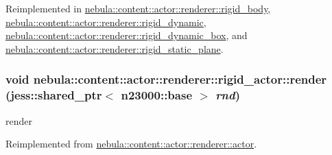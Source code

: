 Reimplemented in \hyperlink{classnebula_1_1content_1_1actor_1_1renderer_1_1rigid__body_a448e47741d24ba24fbedbd7438159a12}{nebula::content::actor::renderer::rigid\_\-body}, \hyperlink{classnebula_1_1content_1_1actor_1_1renderer_1_1rigid__dynamic_ae90eb12e9f68833bd1bf0b8360332f49}{nebula::content::actor::renderer::rigid\_\-dynamic}, \hyperlink{classnebula_1_1content_1_1actor_1_1renderer_1_1rigid__dynamic__box_a26efbc775da4307f9294dab260b43723}{nebula::content::actor::renderer::rigid\_\-dynamic\_\-box}, and \hyperlink{classnebula_1_1content_1_1actor_1_1renderer_1_1rigid__static__plane_a6038d69ad558ad5bfa9e52a7f01afd0b}{nebula::content::actor::renderer::rigid\_\-static\_\-plane}.\hypertarget{classnebula_1_1content_1_1actor_1_1renderer_1_1rigid__actor_a099097e3dd6511e0ae3a25a9f092efcf}{
\subsubsection[{render}]{\setlength{\rightskip}{0pt plus 5cm}void nebula::content::actor::renderer::rigid\_\-actor::render (jess::shared\_\-ptr$<$ {\bf n23000::base} $>$ {\em rnd})}}
\label{classnebula_1_1content_1_1actor_1_1renderer_1_1rigid__actor_a099097e3dd6511e0ae3a25a9f092efcf}


render 

Reimplemented from \hyperlink{classnebula_1_1content_1_1actor_1_1renderer_1_1actor_ab54b9148460295b161e12a2e6b3573d0}{nebula::content::actor::renderer::actor}.

